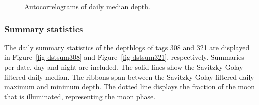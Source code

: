 \documentclass[
  authoryear,
  review,
  3p]{elsarticle}
\begin{document}
\begin{figure}

\begin{minipage}[t]{\linewidth}

{\centering 


}

\end{minipage}%
\newline
\begin{minipage}[t]{\linewidth}

{\centering 


}

\end{minipage}%

\caption{\label{fig-acf}Autocorrelograms of daily median depth.}

\end{figure}

\hypertarget{sec-results-dst-summary}{%
\subsubsection{Summary statistics}\label{sec-results-dst-summary}}

The daily summary statistics of the depthlogs of tags 308 and 321 are
displayed in Figure~\ref{fig-dstsum308} and Figure~\ref{fig-dstsum321},
respectively. Summaries per date, day and night are included. The solid
lines show the Savitzky-Golay filtered daily median. The ribbons span
between the Savitzky-Golay filtered daily maximum and minimum depth. The
dotted line displays the fraction of the moon that is illuminated,
representing the moon phase.
\end{document}
